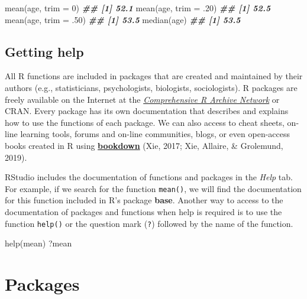 \documentclass[
]{book}
\newenvironment{Shaded}{\begin{snugshade}}{\end{snugshade}}
\newcommand{\AttributeTok}[1]{\textcolor[rgb]{0.77,0.63,0.00}{#1}}
\newcommand{\DecValTok}[1]{\textcolor[rgb]{0.00,0.00,0.81}{#1}}
\newcommand{\DocumentationTok}[1]{\textcolor[rgb]{0.56,0.35,0.01}{\textbf{\textit{#1}}}}
\newcommand{\FunctionTok}[1]{\textcolor[rgb]{0.00,0.00,0.00}{#1}}
\newcommand{\NormalTok}[1]{#1}
\theoremstyle{definition}
\theoremstyle{definition}
\theoremstyle{definition}
\theoremstyle{definition}
\theoremstyle{remark}
\begin{document}
\begin{Shaded}
\begin{Highlighting}[]

\FunctionTok{mean}\NormalTok{(age, }\AttributeTok{trim =} \DecValTok{0}\NormalTok{)}
\DocumentationTok{\#\# [1] 52.1}
\FunctionTok{mean}\NormalTok{(age, }\AttributeTok{trim =}\NormalTok{ .}\DecValTok{20}\NormalTok{)}
\DocumentationTok{\#\# [1] 52.5}
\FunctionTok{mean}\NormalTok{(age, }\AttributeTok{trim =}\NormalTok{ .}\DecValTok{50}\NormalTok{)}
\DocumentationTok{\#\# [1] 53.5}
\FunctionTok{median}\NormalTok{(age)}
\DocumentationTok{\#\# [1] 53.5}
\end{Highlighting}
\end{Shaded}

\hypertarget{getting-help}{%
\subsection{Getting help}\label{getting-help}}

All R functions are included in packages that are created and maintained by their authors (e.g., statisticians, psychologists, biologists, sociologists). R packages are freely available on the Internet at the \href{https://cran.r-project.org/web/packages/}{\emph{Comprehensive R Archive Network}} or CRAN. Every package has its own documentation that describes and explains how to use the functions of each package. We can also access to cheat sheets, on-line learning tools, forums and on-line communities, blogs, or even open-access books created in R using \href{https://bookdown.org/yihui/bookdown/}{\textbf{bookdown}} (Xie, 2017; Xie, Allaire, \& Grolemund, 2019).

RStudio includes the documentation of functions and packages in the \emph{Help} tab. For example, if we search for the function \texttt{mean()}, we will find the documentation for this function included in R's package \textbf{base}. Another way to access to the documentation of packages and functions when help is required is to use the function \texttt{help()} or the question mark (\texttt{?}) followed by the name of the function.

\begin{Shaded}
\begin{Highlighting}[]

\FunctionTok{help}\NormalTok{(mean)}
\NormalTok{?mean}
\end{Highlighting}
\end{Shaded}

\hypertarget{packages}{%
\section{Packages}\label{packages}}
\end{document}
